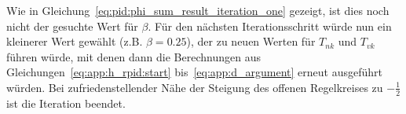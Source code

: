 Wie    in  Gleichung~\ref{eq:pid:phi_sum_result_iteration_one}  gezeigt,   ist
dies  noch  nicht  der  gesuchte  Wert  f\"ur  $\beta$. F\"ur  den  n\"achsten
Iterationsschritt    w\"urde     nun    ein    kleinerer     Wert    gew\"ahlt
(z.B.   $\beta=0.25$),    der   zu    neuen   Werten   f\"ur    $T_{nk}$   und
$T_{vk}$   f\"uhren   w\"urde,   mit   denen   dann   die   Berechnungen   aus
Gleichungen~\ref{eq:app:h_rpid:start}    bis~\ref{eq:app:d_argument}    erneut
ausgef\"uhrt w\"urden. Bei zufriedenstellender N\"ahe der Steigung des offenen
Regelkreises zu $-\frac{1}{2}$ ist die Iteration beendet.
